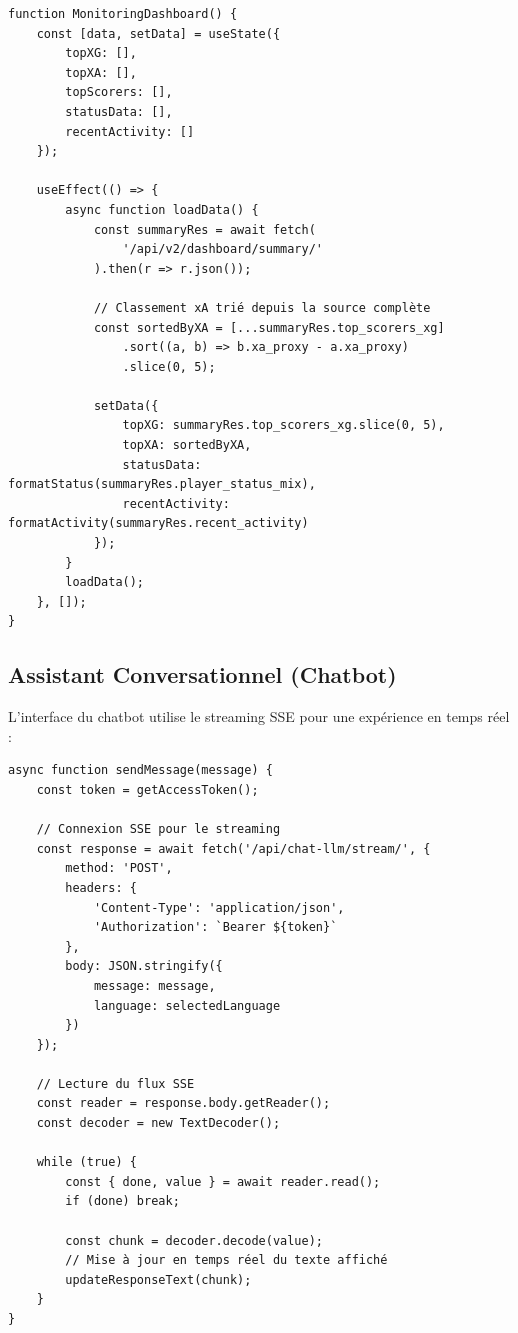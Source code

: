 \begin{lstlisting}[style=codeframe]
function MonitoringDashboard() {
    const [data, setData] = useState({
        topXG: [],
        topXA: [],
        topScorers: [],
        statusData: [],
        recentActivity: []
    });

    useEffect(() => {
        async function loadData() {
            const summaryRes = await fetch(
                '/api/v2/dashboard/summary/'
            ).then(r => r.json());

            // Classement xA trié depuis la source complète
            const sortedByXA = [...summaryRes.top_scorers_xg]
                .sort((a, b) => b.xa_proxy - a.xa_proxy)
                .slice(0, 5);

            setData({
                topXG: summaryRes.top_scorers_xg.slice(0, 5),
                topXA: sortedByXA,
                statusData: formatStatus(summaryRes.player_status_mix),
                recentActivity: formatActivity(summaryRes.recent_activity)
            });
        }
        loadData();
    }, []);
}
\end{lstlisting}

\subsection{Assistant Conversationnel (Chatbot)}

L'interface du chatbot utilise le streaming SSE pour une expérience en temps réel :

\begin{lstlisting}[style=codeframe]
async function sendMessage(message) {
    const token = getAccessToken();

    // Connexion SSE pour le streaming
    const response = await fetch('/api/chat-llm/stream/', {
        method: 'POST',
        headers: {
            'Content-Type': 'application/json',
            'Authorization': `Bearer ${token}`
        },
        body: JSON.stringify({
            message: message,
            language: selectedLanguage
        })
    });

    // Lecture du flux SSE
    const reader = response.body.getReader();
    const decoder = new TextDecoder();

    while (true) {
        const { done, value } = await reader.read();
        if (done) break;

        const chunk = decoder.decode(value);
        // Mise à jour en temps réel du texte affiché
        updateResponseText(chunk);
    }
}
\end{lstlisting}


